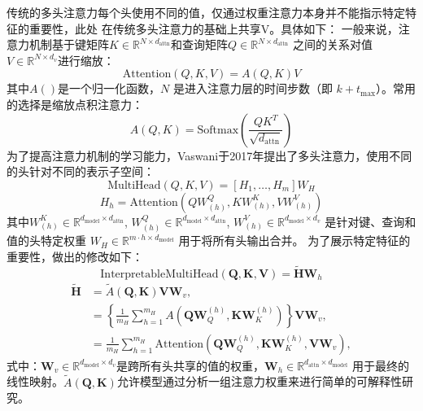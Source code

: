 传统的多头注意力每个头使用不同的值，仅通过权重注意力本身并不能指示特定特征的重要性，此处
在传统多头注意力的基础上共享V。具体如下：
一般来说，注意力机制基于键矩阵\( K \in \mathbb{R}^{N \times d_{\text{attn}}} \)和查询矩阵\( Q \in \mathbb{R}^{N \times d_{\text{attn}}} \)
之间的关系对值\( V \in \mathbb{R}^{N \times d_v} \)进行缩放：
\begin{equation}
    \text{Attention}(Q, K, V) = A(Q,K)V
\end{equation}
其中$A()$是一个归一化函数，\( N \) 是进入注意力层的时间步数（即 \( k + t_{\text{max}} \)）。常用的选择是缩放点积注意力：
\begin{equation}
    A(Q, K) = \text{Softmax}\left(\frac{QK^T}{\sqrt{d_{\text{attn}}}}\right)
\end{equation}
为了提高注意力机制的学习能力，Vaswani于2017年提出了多头注意力，使用不同的头针对不同的表示子空间：
\begin{equation}
    \text{MultiHead}(Q, K, V) = [H_1, \ldots, H_m]W_H
\end{equation}
\begin{equation}
    H_h = \text{Attention}(QW^Q_{(h)}, KW^K_{(h)}, VW^V_{(h)})
\end{equation}
其中\( W^K_{(h)} \in \mathbb{R}^{d_{\text{model}} \times d_{\text{attn}}} \), \( W^Q_{(h)} \in \mathbb{R}^{d_{\text{model}} \times d_{\text{attn}}} \), \( W^V_{(h)} \in \mathbb{R}^{d_{\text{model}} \times d_v} \) 
是针对键、查询和值的头特定权重 \( W_H \in \mathbb{R}^{m \cdot h \times d_{\text{model}}} \) 用于将所有头输出合并。
为了展示特定特征的重要性，做出的修改如下：
\begin{equation}
    \text{InterpretableMultiHead}(\mathbf{Q}, \mathbf{K}, \mathbf{V}) = \tilde{\mathbf{H}} \mathbf{W}_h
\end{equation}
\begin{equation}
    \begin{aligned}
        \mathbf{\tilde{H}} &= \tilde{A}(\mathbf{Q}, \mathbf{K}) \mathbf{V} \mathbf{W}_v, \\
        &= \left\{ \frac{1}{m_H} \sum_{h=1}^{m_H} A(\mathbf{Q} \mathbf{W}_Q^{(h)}, \mathbf{K} \mathbf{W}_K^{(h)}) \right\} \mathbf{V} \mathbf{W}_v, \\
        &= \frac{1}{m_H} \sum_{h=1}^{m_H} \text{Attention}(\mathbf{Q} \mathbf{W}_Q^{(h)}, \mathbf{K} \mathbf{W}_K^{(h)}, \mathbf{V} \mathbf{W}_v),
    \end{aligned}        
\end{equation}
式中：$\mathbf{W}_v \in \mathbb{R}^{d_{\text{model}} \times d_v}$是跨所有头共享的值的权重，$\mathbf{W}_h \in \mathbb{R}^{d_{\text{attn}} \times d_{\text{model}}}$
用于最终的线性映射。$\tilde{A}(\mathbf{Q}, \mathbf{K})$允许模型通过分析一组注意力权重来进行简单的可解释性研究。

